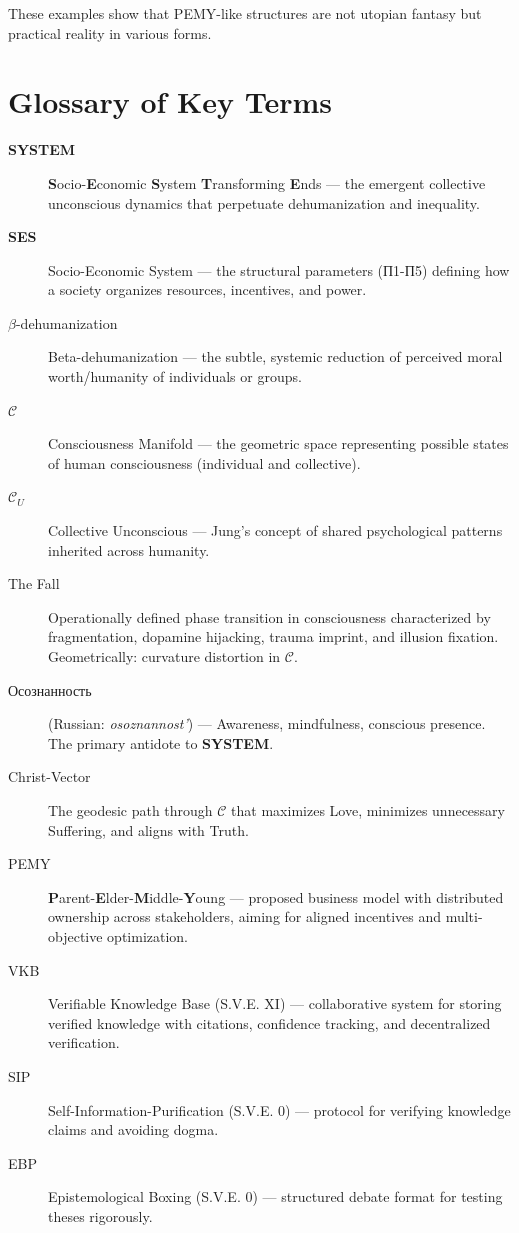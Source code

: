 \documentclass[11pt,a4paper]{article}
\newcommand{\SYSTEM}{\textbf{SYSTEM}}
\newcommand{\SES}{\textbf{SES}}
\newcommand{\betaDehum}{$\beta$-dehumanization}
\newcommand{\CC}{$\mathcal{C}$}
\newcommand{\CU}{$\mathcal{C}_U$}
\theoremstyle{definition}
\theoremstyle{remark}
\begin{document}
These examples show that PEMY-like structures are not utopian fantasy but practical reality in various forms.

\section{Glossary of Key Terms}

\begin{description}
\item[\SYSTEM{}] \textbf{S}ocio-\textbf{E}conomic \textbf{S}ystem \textbf{T}ransforming \textbf{E}nds — the emergent collective unconscious dynamics that perpetuate dehumanization and inequality.

\item[\SES{}] Socio-Economic System — the structural parameters (П1-П5) defining how a society organizes resources, incentives, and power.

\item[\betaDehum{}] Beta-dehumanization — the subtle, systemic reduction of perceived moral worth/humanity of individuals or groups.

\item[\CC{}] Consciousness Manifold — the geometric space representing possible states of human consciousness (individual and collective).

\item[\CU{}] Collective Unconscious — Jung's concept of shared psychological patterns inherited across humanity.

\item[The Fall] Operationally defined phase transition in consciousness characterized by fragmentation, dopamine hijacking, trauma imprint, and illusion fixation. Geometrically: curvature distortion in \CC{}.

\item[Осознанность] (Russian: \textit{osoznannost'}) — Awareness, mindfulness, conscious presence. The primary antidote to \SYSTEM{}.

\item[Christ-Vector] The geodesic path through \CC{} that maximizes Love, minimizes unnecessary Suffering, and aligns with Truth.

\item[PEMY] \textbf{P}arent-\textbf{E}lder-\textbf{M}iddle-\textbf{Y}oung — proposed business model with distributed ownership across stakeholders, aiming for aligned incentives and multi-objective optimization.

\item[VKB] Verifiable Knowledge Base (S.V.E. XI) — collaborative system for storing verified knowledge with citations, confidence tracking, and decentralized verification.

\item[SIP] Self-Information-Purification (S.V.E. 0) — protocol for verifying knowledge claims and avoiding dogma.

\item[EBP] Epistemological Boxing (S.V.E. 0) — structured debate format for testing theses rigorously.
\end{description}
\end{document}
